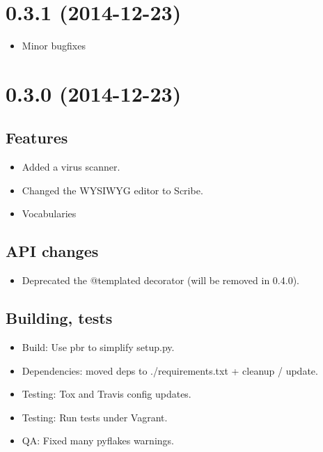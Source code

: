 \documentclass[a4paper,12pt,english]{sphinxmanual}
\begin{document}
\section{0.3.1 (2014-12-23)}
\label{changelog:id6}\begin{itemize}
\item {} 
Minor bugfixes

\end{itemize}


\section{0.3.0 (2014-12-23)}
\label{changelog:id7}

\subsection{Features}
\label{changelog:id8}\begin{itemize}
\item {} 
Added a virus scanner.

\item {} 
Changed the WYSIWYG editor to Scribe.

\item {} 
Vocabularies

\end{itemize}


\subsection{API changes}
\label{changelog:api-changes}\begin{itemize}
\item {} 
Deprecated the @templated decorator (will be removed in 0.4.0).

\end{itemize}


\subsection{Building, tests}
\label{changelog:building-tests}\begin{itemize}
\item {} 
Build: Use pbr to simplify setup.py.

\item {} 
Dependencies: moved deps to ./requirements.txt + cleanup / update.

\item {} 
Testing: Tox and Travis config updates.

\item {} 
Testing: Run tests under Vagrant.

\item {} 
QA: Fixed many pyflakes warnings.

\end{itemize}
\end{document}
